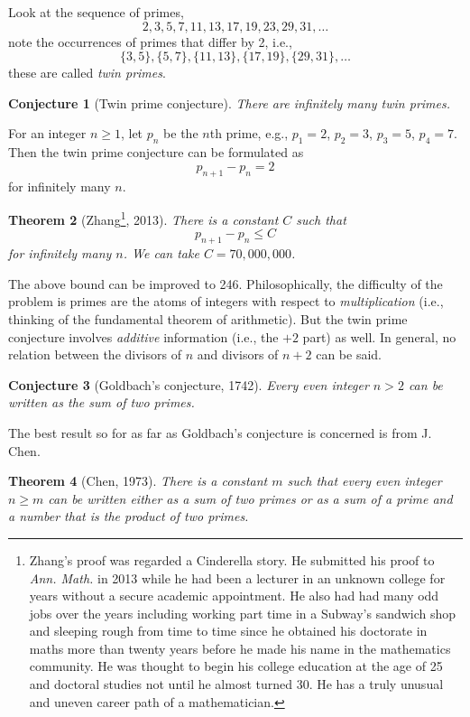 \documentclass{amsbook}
\theoremstyle{plain}
\newtheorem{theorem}{Theorem}[chapter] %
\newtheorem{conjecture}[theorem]{Conjecture}
\theoremstyle{definition}
\theoremstyle{remark}
\numberwithin{equation}{chapter}
\numberwithin{figure}{chapter}
\begin{document}
Look at the sequence of primes,
\[
2, 3, 5, 7, 11, 13, 17, 19, 23, 29, 31, \ldots  
\]
 note the occurrences of primes that differ by 2, i.e., 
\[
\{3, 5\}, \{5, 7\}, \{11, 13\}, \{17, 19\}, \{29, 31\}, \ldots 
\]
these are called \emph{twin primes}.
\begin{conjecture}[Twin prime conjecture]
There are infinitely many twin primes.
\end{conjecture}
For an integer $n \geqslant 1$, let $p_n$ be the $n$th prime, e.g., $p_1 = 2$, $p_2 = 3$, $p_3 = 5$, $p_4 = 7$. Then the twin prime conjecture can be formulated as 
\[
p_{n+1} - p_n = 2 
\]
for infinitely many $n$.
\begin{theorem}[Zhang\footnote{Zhang's proof was regarded a Cinderella story. He submitted his proof to \emph{Ann. Math.} in 2013 while he had been a lecturer in an unknown college for years without a secure academic appointment. He also had had many odd jobs over the years including working part time in a Subway's sandwich shop and sleeping rough from time to time since he obtained his doctorate in maths more than twenty years before he made his name in the mathematics community. He was thought to begin his college education at the age of 25 and doctoral studies not until he almost turned 30. He has a truly unusual and uneven career path of a mathematician.}, 2013]
There is a constant $C$ such that 
\[
p_{n+1} - p_n \leqslant C
\]
for infinitely many $n$. We can take $C = 70,000,000$. 
\end{theorem}
The above bound can be improved to 246. Philosophically, the difficulty of the problem is primes are the atoms of integers with respect to \emph{multiplication} (i.e., thinking of the fundamental theorem of arithmetic). But the twin prime conjecture involves \emph{additive} information (i.e., the $+2$ part) as well. In general, no relation between the divisors of $n$ and divisors of $n+2$ can be said.

\begin{conjecture}[Goldbach's conjecture, 1742]
Every even integer $n > 2$ can be written as the sum of two primes. 
\end{conjecture}

The best result so for as far as Goldbach's conjecture is concerned is from J. Chen.
\begin{theorem}[Chen, 1973]
There is a constant $m$ such that every even integer $n \geqslant m$ can be written either as a sum of two primes or as a sum of a prime and a number that is the product of two primes.
\end{theorem}
\end{document}
